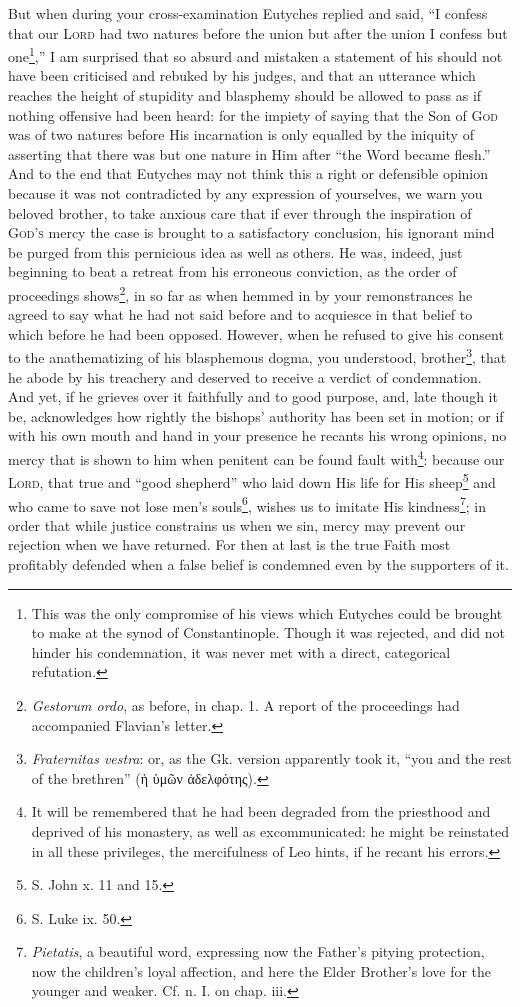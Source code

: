 But when during your cross-examination Eutyches replied and said, “I confess that our \textsc{Lord} had two natures before the union but after the union I confess but one\footnote{This was the only compromise of his views which Eutyches could be brought to make at the synod of Constantinople. Though it was rejected, and did not hinder his condemnation, it was never met with a direct, categorical refutation.},” I am surprised that so absurd and mistaken a statement of his should not have been criticised and rebuked by his judges, and that an utterance which reaches the height of stupidity and blasphemy should be allowed to pass as if nothing offensive had been heard: for the impiety of saying that the Son of \textsc{God} was of two natures before His incarnation is only equalled by the iniquity of asserting that there was but one nature in Him after “the Word became flesh.” And to the end that Eutyches may not think this a right or defensible opinion because it was not contradicted by any expression of yourselves, we warn you beloved brother, to take anxious care that if ever through the inspiration of \textsc{God’s} mercy the case is brought to a satisfactory conclusion, his ignorant mind be purged from this pernicious idea as well as others. He was, indeed, just beginning to beat a retreat from his erroneous conviction, as the order of proceedings shows\footnote{\emph{Gestorum ordo}, as before, in chap. 1. A report of the proceedings had accompanied Flavian’s letter.}, in so far as when hemmed in by your remonstrances he agreed to say what he had not said before and to acquiesce in that belief to which before he had been opposed. However, when he refused to give his consent to the anathematizing of his blasphemous dogma, you understood, brother\footnote{\emph{Fraternitas vestra}: or, as the Gk. version apparently took it, “you and the rest of the brethren” (\textgreek{ἡ ὑμῶν ἀδελφότης}).}, that he abode by his treachery and deserved to receive a verdict of condemnation. And yet, if he grieves over it faithfully and to good purpose, and, late though it be, acknowledges how rightly the bishops’ authority has been set in motion; or if with his own mouth and hand in your presence he recants his wrong opinions, no mercy that is shown to him when penitent can be found fault with\footnote{It will be remembered that he had been degraded from the priesthood and deprived of his monastery, as well as excommunicated: he might be reinstated in all these privileges, the mercifulness of Leo hints, if he recant his errors.}: because our \textsc{Lord}, that true and “good shepherd” who laid down His life for His sheep\footnote{S. John x. 11 and 15.} and who came to save not lose men’s souls\footnote{S. Luke ix. 50.}, wishes us to imitate His kindness\footnote{\emph{Pietatis}, a beautiful word, expressing now the Father’s pitying protection, now the children’s loyal affection, and here the Elder Brother’s love for the younger and weaker. Cf. n. I. on chap. iii.}; in order that while justice constrains us when we sin, mercy may prevent our rejection when we have returned. For then at last is the true Faith most profitably defended when a false belief is condemned even by the supporters of it.

